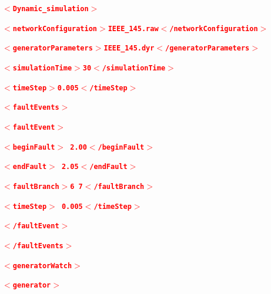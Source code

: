 \documentclass[12pt]{report} %
\begin{document}
\textcolor{red}{\texttt{\textbf{  $\boldsymbol{\mathrm{<}}$Dynamic\_simulation$\boldsymbol{\mathrm{>}}$}}}

\textcolor{red}{\texttt{\textbf{    $\boldsymbol{\mathrm{<}}$networkConfiguration$\boldsymbol{\mathrm{>}}$IEEE\_145.raw$\boldsymbol{\mathrm{<}}$/networkConfiguration$\boldsymbol{\mathrm{>}}$}}}

\textcolor{red}{\texttt{\textbf{    $\boldsymbol{\mathrm{<}}$generatorParameters$\boldsymbol{\mathrm{>}}$IEEE\_145.dyr$\boldsymbol{\mathrm{<}}$/generatorParameters$\boldsymbol{\mathrm{>}}$}}}

\textcolor{red}{\texttt{\textbf{    $\boldsymbol{\mathrm{<}}$simulationTime$\boldsymbol{\mathrm{>}}$30$\boldsymbol{\mathrm{<}}$/simulationTime$\boldsymbol{\mathrm{>}}$}}}

\textcolor{red}{\texttt{\textbf{    $\boldsymbol{\mathrm{<}}$timeStep$\boldsymbol{\mathrm{>}}$0.005$\boldsymbol{\mathrm{<}}$/timeStep$\boldsymbol{\mathrm{>}}$}}}

\textcolor{red}{\texttt{\textbf{    $\boldsymbol{\mathrm{<}}$faultEvents$\boldsymbol{\mathrm{>}}$}}}

\textcolor{red}{\texttt{\textbf{      $\boldsymbol{\mathrm{<}}$faultEvent$\boldsymbol{\mathrm{>}}$}}}

\textcolor{red}{\texttt{\textbf{        $\boldsymbol{\mathrm{<}}$beginFault$\boldsymbol{\mathrm{>}}$ 2.00$\boldsymbol{\mathrm{<}}$/beginFault$\boldsymbol{\mathrm{>}}$}}}

\textcolor{red}{\texttt{\textbf{        $\boldsymbol{\mathrm{<}}$endFault$\boldsymbol{\mathrm{>}}$   2.05$\boldsymbol{\mathrm{<}}$/endFault$\boldsymbol{\mathrm{>}}$}}}

\textcolor{red}{\texttt{\textbf{        $\boldsymbol{\mathrm{<}}$faultBranch$\boldsymbol{\mathrm{>}}$6 7$\boldsymbol{\mathrm{<}}$/faultBranch$\boldsymbol{\mathrm{>}}$}}}

\textcolor{red}{\texttt{\textbf{        $\boldsymbol{\mathrm{<}}$timeStep$\boldsymbol{\mathrm{>}}$   0.005$\boldsymbol{\mathrm{<}}$/timeStep$\boldsymbol{\mathrm{>}}$}}}

\textcolor{red}{\texttt{\textbf{      $\boldsymbol{\mathrm{<}}$/faultEvent$\boldsymbol{\mathrm{>}}$}}}

\textcolor{red}{\texttt{\textbf{    $\boldsymbol{\mathrm{<}}$/faultEvents$\boldsymbol{\mathrm{>}}$}}}

\textcolor{red}{\texttt{\textbf{    $\boldsymbol{\mathrm{<}}$generatorWatch$\boldsymbol{\mathrm{>}}$}}}

\textcolor{red}{\texttt{\textbf{      $\boldsymbol{\mathrm{<}}$generator$\boldsymbol{\mathrm{>}}$}}}
\end{document}
